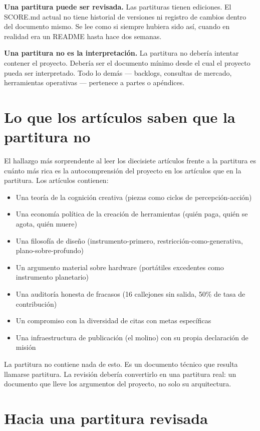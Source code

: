 \documentclass[10pt,letterpaper,twocolumn]{article}
\begin{document}
\textbf{Una partitura puede ser revisada.} Las partituras tienen ediciones. El SCORE.md actual no tiene historial de versiones ni registro de cambios dentro del documento mismo. Se lee como si siempre hubiera sido as\'i, cuando en realidad era un README hasta hace dos semanas.

\textbf{Una partitura no es la interpretaci\'on.} La partitura no deber\'ia intentar contener el proyecto. Deber\'ia ser el documento m\'inimo desde el cual el proyecto pueda ser interpretado. Todo lo dem\'as --- backlogs, consultas de mercado, herramientas operativas --- pertenece a partes o ap\'endices.

\section{Lo que los art\'iculos saben que la partitura no}

El hallazgo m\'as sorprendente al leer los diecisiete art\'iculos frente a la partitura es cu\'anto m\'as rica es la autocomprensi\'on del proyecto en los art\'iculos que en la partitura. Los art\'iculos contienen:

\begin{itemize}
\item Una teor\'ia de la cognici\'on creativa (piezas como ciclos de percepci\'on-acci\'on)
\item Una econom\'ia pol\'itica de la creaci\'on de herramientas (qui\'en paga, qui\'en se agota, qui\'en muere)
\item Una filosof\'ia de dise\~no (instrumento-primero, restricci\'on-como-generativa, plano-sobre-profundo)
\item Un argumento material sobre hardware (port\'atiles excedentes como instrumento planetario)
\item Una auditor\'ia honesta de fracasos (16 callejones sin salida, 50\% de tasa de contribuci\'on)
\item Un compromiso con la diversidad de citas con metas espec\'ificas
\item Una infraestructura de publicaci\'on (el molino) con su propia declaraci\'on de misi\'on
\end{itemize}

La partitura no contiene nada de esto. Es un documento t\'ecnico que resulta llamarse partitura. La revisi\'on deber\'ia convertirlo en una partitura real: un documento que lleve los argumentos del proyecto, no solo su arquitectura.

\section{Hacia una partitura revisada}
\end{document}
